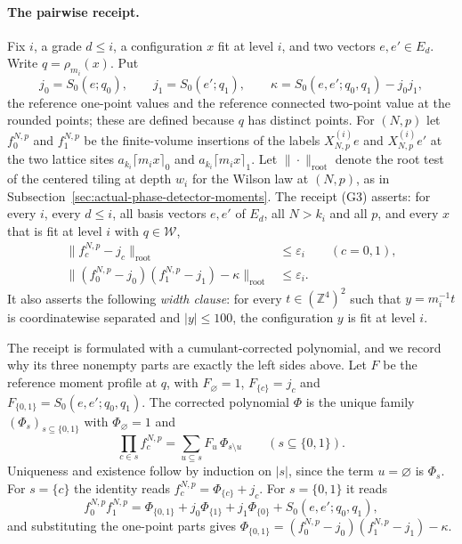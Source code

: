 \paragraph{The pairwise receipt.}
Fix $i$, a grade $d\le i$, a configuration $x$ fit at level $i$, and two
vectors $e,e'\in E_d$. Write $q=\rho_{m_i}(x)$. Put
\[
 j_0=S_0(e;q_0),\qquad j_1=S_0(e';q_1),\qquad
 \kappa=S_0(e,e';q_0,q_1)-j_0j_1,
\]
the reference one-point values and the reference connected two-point
value at the rounded points; these are defined because $q$ has distinct
points. For $(N,p)$ let $f_0^{N,p}$ and $f_1^{N,p}$ be the finite-volume
insertions of the labels $X^{(i)}_{N,p}e$ and $X^{(i)}_{N,p}e'$ at the
two lattice sites $a_{k_i}\lceil m_ix\rceil_0$ and
$a_{k_i}\lceil m_ix\rceil_1$. Let $\|\cdot\|_{\mathrm{root}}$ denote the
root test of the centered tiling at depth $w_i$ for the Wilson law at
$(N,p)$, as in
Subsection~\ref{sec:actual-phase-detector-moments}.
The receipt (G3) asserts: for every $i$, every $d\le i$, all basis vectors
$e,e'$ of $E_d$, all $N>k_i$ and all $p$, and every $x$ that is fit at
level $i$ with $q\in\mathcal W$,
\begin{align}
 \|f_c^{N,p}-j_c\|_{\mathrm{root}}&\le\varepsilon_i\qquad(c=0,1),
 \label{eq:trace-rounded-receipt-one}\\
 \|(f_0^{N,p}-j_0)(f_1^{N,p}-j_1)-\kappa\|_{\mathrm{root}}
 &\le\varepsilon_i .
 \label{eq:trace-rounded-receipt-two}
\end{align}
It also asserts the following \emph{width clause}: for every
$t\in(\mathbb Z^4)^2$ such that $y=m_i^{-1}t$ is coordinatewise separated
and $|y|\le100$, the configuration $y$ is fit at level $i$.

The receipt is formulated with a cumulant-corrected polynomial, and we
record why its three nonempty parts are exactly the left sides above. Let
$F$ be the reference moment profile at $q$, with
$F_\varnothing=1$, $F_{\{c\}}=j_c$ and $F_{\{0,1\}}=S_0(e,e';q_0,q_1)$.
The corrected polynomial $\Phi$ is the unique family
$(\Phi_s)_{s\subseteq\{0,1\}}$ with $\Phi_\varnothing=1$ and
\[
 \prod_{c\in s}f_c^{N,p}=\sum_{u\subseteq s}F_u\,\Phi_{s\setminus u}
 \qquad(s\subseteq\{0,1\}).
\]
Uniqueness and existence follow by induction on $|s|$, since the term
$u=\varnothing$ is $\Phi_s$. For $s=\{c\}$ the identity reads
$f_c^{N,p}=\Phi_{\{c\}}+j_c$. For $s=\{0,1\}$ it reads
\[
 f_0^{N,p}f_1^{N,p}=\Phi_{\{0,1\}}+j_0\Phi_{\{1\}}+j_1\Phi_{\{0\}}
     +S_0(e,e';q_0,q_1),
\]
and substituting the one-point parts gives
$\Phi_{\{0,1\}}=(f_0^{N,p}-j_0)(f_1^{N,p}-j_1)-\kappa$.

